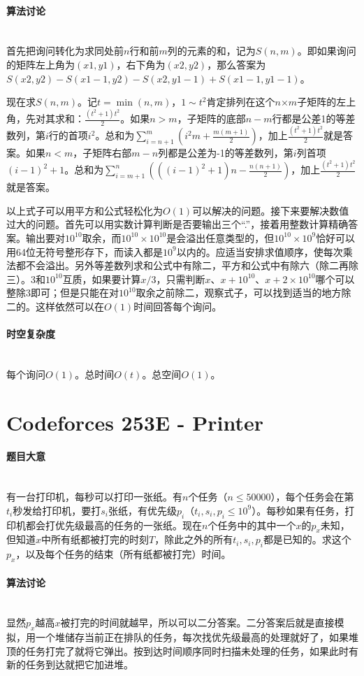 \documentclass[UTF8]{ctexart}
\newcommand{\myparagraph}[1]{\paragraph{#1}\mbox{}\\}
\theoremstyle{nonumberplain}
\begin{document}
		\myparagraph{算法讨论}
		
			首先把询问转化为求同处前$n$行和前$m$列的元素的和，记为$S(n,m)$。即如果询问的矩阵左上角为$(x1,y1)$，右下角为$(x2,y2)$，那么答案为$S(x2,y2)-S(x1-1,y2)-S(x2,y1-1)+S(x1-1,y1-1)$。
			
			现在求$S(n,m)$。记$t=\min(n,m)$，$1 \sim t^2$肯定排列在这个$n$×$m$子矩阵的左上角，先对其求和：$\frac{(t^2+1)t^2}{2}$。如果$n>m$，子矩阵的底部$n-m$行都是公差1的等差数列，第$i$行的首项$i^2$。总和为$\sum_{i=n+1}^m(i^2m+\frac{m(m+1)}{2})$，加上$\frac{(t^2+1)t^2}{2}$就是答案。如果$n<m$，子矩阵右部$m-n$列都是公差为-1的等差数列，第$i$列首项$(i-1)^2+1$。总和为$\sum_{i=m+1}^n(((i-1)^2+1)n-\frac{n(n+1)}{2})$，加上$\frac{(t^2+1)t^2}{2}$就是答案。
			
			以上式子可以用平方和公式轻松化为$O(1)$可以解决的问题。接下来要解决数值过大的问题。首先可以用实数计算判断是否要输出三个“.”，接着用整数计算精确答案。输出要对$10^{10}$取余，而$10^{10} \times 10^{10}$是会溢出任意类型的，但$10^{10} \times 10^9$恰好可以用64位无符号整形存下，而读入都是$10^9$以内的。应适当安排求值顺序，使每次乘法都不会溢出。另外等差数列求和公式中有除二，平方和公式中有除六（除二再除三）。3和$10^{10}$互质，如果要计算$x/3$，只需判断$x$、$x+10^{10}$、$x+2 \times 10^{10}$哪个可以整除3即可；但是只能在对$10^{10}$取余之前除二，观察式子，可以找到适当的地方除二的。这样依然可以在$O(1)$时间回答每个询问。
		
		\myparagraph{时空复杂度}
		
			每个询问$O(1)$。总时间$O(t)$。总空间$O(1)$。
	
	\section{Codeforces 253E - Printer}
	
		\myparagraph{题目大意}
		
			有一台打印机，每秒可以打印一张纸。有$n$个任务（$n \leq 50000$），每个任务会在第$t_i$秒发给打印机，要打$s_i$张纸，有优先级$p_i$（$t_i,s_i,p_i \leq 10^9$）。每秒如果有任务，打印机都会打优先级最高的任务的一张纸。现在$n$个任务中的其中一个$x$的$p_x$未知，但知道$x$中所有纸都被打完的时刻$T$，除此之外的所有$t_i,s_i,p_i$都是已知的。求这个$p_x$，以及每个任务的结束（所有纸都被打完）时间。
		
		\myparagraph{算法讨论}
		
			显然$p_x$越高$x$被打完的时间就越早，所以可以二分答案。二分答案后就是直接模拟，用一个堆储存当前正在排队的任务，每次找优先级最高的处理就好了，如果堆顶的任务打完了就将它弹出。按到达时间顺序同时扫描未处理的任务，如果此时有新的任务到达就把它加进堆。
		
\end{document}
